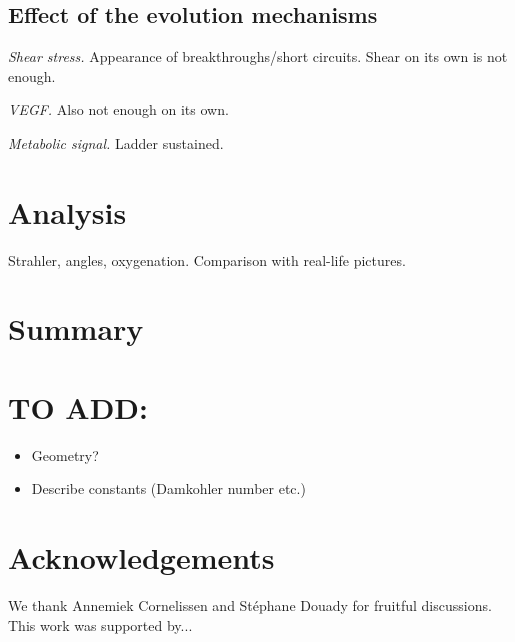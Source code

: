 \documentclass[aps,pra,a4paper,twocolumn,10pt,superscriptaddress,longbibliography]{revtex4-1}
\begin{document}
\subsection{Effect of the evolution mechanisms}
\emph{Shear stress.} Appearance of breakthroughs/short circuits. Shear on its own is not enough.

\emph{VEGF.} Also not enough on its own.

\emph{Metabolic signal.} Ladder sustained.
%
\section{Analysis}
\label{sec:analysis}
%
Strahler, angles, oxygenation. Comparison with real-life pictures.
%
\section{Summary}
\label{sec:sumarry}
%

\section*{TO ADD:}
%
\begin{itemize}
\item Geometry?
\item Describe constants (Damkohler number etc.)
\end{itemize}




\section*{Acknowledgements}
%
We thank Annemiek Cornelissen and Stéphane Douady for fruitful discussions. This work was supported by...


%

\end{document}
